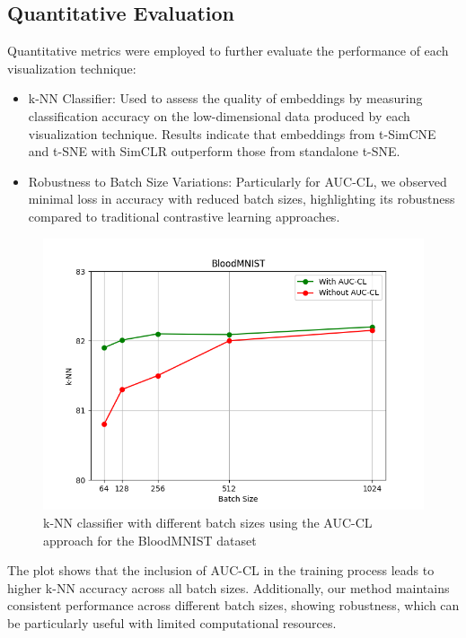 \subsection{Quantitative Evaluation}

Quantitative metrics were employed to further evaluate the performance of each visualization technique:

\begin{itemize}
    \item {k-NN Classifier}: Used to assess the quality of embeddings by measuring classification accuracy on the low-dimensional data produced by each visualization technique. Results indicate that embeddings from t-SimCNE and t-SNE with SimCLR outperform those from standalone t-SNE.
    \item {Robustness to Batch Size Variations}: Particularly for AUC-CL, we observed minimal loss in accuracy with reduced batch sizes, highlighting its robustness compared to traditional contrastive learning approaches.
\end{itemize}

\begin{figure}[hbt]
\centering
\includegraphics[width=\textwidth]{figs/accuracy_comparison.png}
\caption{
k-NN classifier with different batch sizes using the AUC-CL approach for the BloodMNIST dataset
}
\label{fig:knn_comparison}
\end{figure}


The plot  shows that the inclusion of AUC-CL in the training process leads to higher k-NN accuracy across all batch sizes. 
Additionally, our method maintains consistent performance across different batch sizes, showing robustness, which can be particularly useful with limited computational resources.



